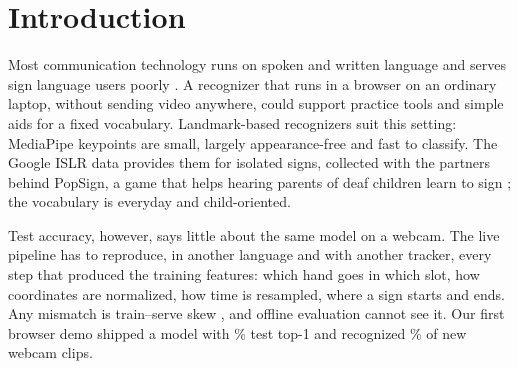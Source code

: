\section{Introduction}
\label{sec:intro}

Most communication technology runs on spoken and written language and serves sign language
users poorly \citep{bragg2019interdisciplinary,yin2021including}. A recognizer that runs in a
browser on an ordinary laptop, without sending video anywhere, could support practice tools and
simple aids for a fixed vocabulary. Landmark-based recognizers suit this setting: MediaPipe
keypoints \citep{lugaresi2019mediapipe} are small, largely appearance-free and fast to classify. The
Google ISLR data \citep{kaggle2023islr} provides them for  isolated signs, collected
with the partners behind PopSign, a game that helps hearing parents of deaf children learn to sign
\citep{starner2023popsign}; the vocabulary is everyday and child-oriented.

Test accuracy, however, says little about the same model on a webcam. The live pipeline has to
reproduce, in another language and with another tracker, every step that produced the training
features: which hand goes in which slot, how coordinates
are normalized, how time is resampled, where a sign starts and ends. Any mismatch is train--serve
skew \citep{sculley2015debt,breck2017mltestscore}, and offline evaluation cannot see it. Our
first browser demo shipped a model with \% test top-1 and recognized
\% of new webcam clips.

